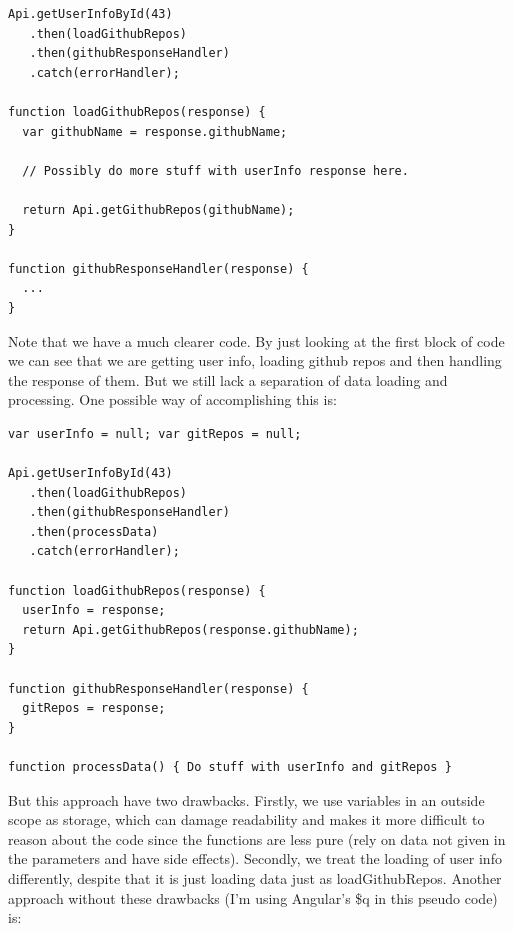 \documentclass[a4paper,12pt]{article}
\begin{document}
\begin{lstlisting}[caption={Code where we use promises and the possibility to chain promises to load two pieces of data, where the second is dependent on the first}, frame=single]
Api.getUserInfoById(43)
   .then(loadGithubRepos)
   .then(githubResponseHandler)
   .catch(errorHandler);

function loadGithubRepos(response) {
  var githubName = response.githubName;

  // Possibly do more stuff with userInfo response here.

  return Api.getGithubRepos(githubName);
}

function githubResponseHandler(response) {
  ...
}
\end{lstlisting}
Note that we have a much clearer code. By just looking at the first block of code we can see that we are getting user info, loading github repos and then handling the
response of them. But we still lack a separation of data loading and processing. One possible way of accomplishing this is:

\begin{lstlisting}[caption={Code where we chain promises together and separate data loading from data processing. However, note that we use variables in the scope outside where we load our data.}, frame=single]
var userInfo = null; var gitRepos = null;

Api.getUserInfoById(43)
   .then(loadGithubRepos)
   .then(githubResponseHandler)
   .then(processData)
   .catch(errorHandler);

function loadGithubRepos(response) {
  userInfo = response;
  return Api.getGithubRepos(response.githubName);
}

function githubResponseHandler(response) {
  gitRepos = response;
}

function processData() { Do stuff with userInfo and gitRepos }
\end{lstlisting}
But this approach have two drawbacks. Firstly, we use variables in an outside scope as storage, which can damage readability and makes it more difficult to reason about the code since the functions are less pure (rely on data not given in the parameters and have side effects).
Secondly, we treat the loading of user info differently, despite that it is just loading data just as loadGithubRepos.
Another approach without these drawbacks (I'm using Angular's \$q in this pseudo code) is:
\end{document}
